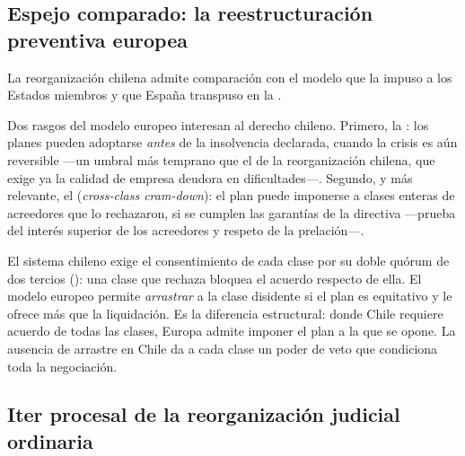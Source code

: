 \subsection{Espejo comparado: la reestructuración preventiva europea}

La reorganización chilena admite comparación con el modelo que la  \parencite{ue-directiva-2019-1023} impuso a los Estados miembros y que España
transpuso en la  \parencite{esp-ley16-2022}.

Dos rasgos del modelo europeo interesan al derecho chileno. Primero, la
: los planes pueden adoptarse \emph{antes} de la
insolvencia declarada, cuando la crisis es aún reversible ---un umbral más temprano que el de la
reorganización chilena, que exige ya la calidad de empresa deudora en dificultades---. Segundo, y
más relevante, el  (\emph{cross-class cram-down}): el plan
puede imponerse a clases enteras de acreedores que lo rechazaron, si se cumplen las garantías de
la directiva ---prueba del interés superior de los acreedores y respeto de la prelación---.

\begin{foco}
El sistema chileno exige el consentimiento de cada clase por su doble quórum de dos tercios
(): una clase que rechaza bloquea el acuerdo respecto de ella. El modelo europeo permite
\emph{arrastrar} a la clase disidente si el plan es equitativo y le ofrece más que la
liquidación. Es la diferencia estructural: donde Chile requiere acuerdo de todas las clases,
Europa admite imponer el plan a la que se opone. La ausencia de arrastre en Chile da a cada
clase un poder de veto que condiciona toda la negociación.
\end{foco}

\bloquePractico

\subsection{Iter procesal de la reorganización judicial ordinaria}

